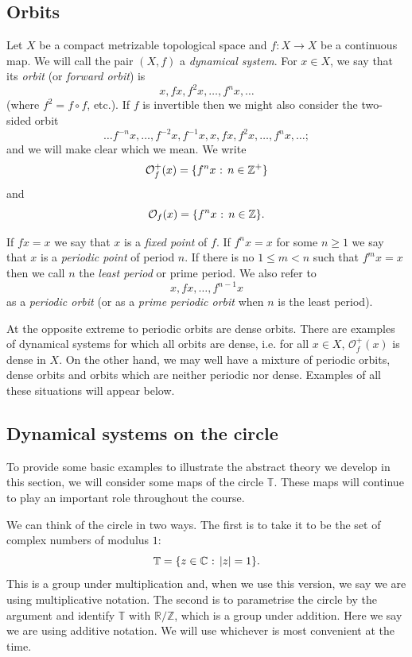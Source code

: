 \documentclass[12pt]{article}
\theoremstyle{definition}
\theoremstyle{remark}
\begin{document}
\subsection{Orbits}

Let $X$ be a compact metrizable topological space and $f: X \to X$ be a continuous map. 
We will call the pair $(X,f)$ a {\it dynamical system}.
For $x \in X$, we say that its {\it orbit} 
(or {\it forward orbit}) is
\[
x, fx, f^2x ,\ldots, f^nx ,\ldots
\]
(where $f^2 = f \circ f$, etc.).
If $f$ is invertible then we might also consider the two-sided orbit
\[
\ldots f^{-n}x ,\ldots ,f^{-2}x,f^{-1}x,x,fx,f^2x,\ldots,f^nx,\ldots;
\]
and we will make clear which we mean. We write
\[
\mathcal O_f^+(x) = \{f^n x \hbox{ : } n\in \mathbb Z^+\}
\]
and 
\[
\mathcal O_f(x) = \{f^n x \hbox{ : } n\in \mathbb Z\}.
\]

If $fx=x$ we say that $x$ is a {\it fixed point} of $f$. If $f^nx=x$ for some $n \ge 1$ we say that 
$x$ is a {\it periodic point} of period $n$. If there is no $1 \le m <n$ such that
$f^mx=x$ then we call $n$ the {\it least period} or prime period. We also refer to
\[
x,fx, \ldots, f^{n-1}x
\]
as a {\it periodic orbit} (or as a {\it prime periodic orbit} when $n$ is the least period).

At the opposite extreme to periodic orbits are dense orbits. There are examples of dynamical systems for which all orbits are dense, i.e. for all $x \in X$, $\mathcal O^+_f(x)$ is dense in $X$. On the other hand, we may well have a mixture of periodic orbits, dense orbits and orbits which are neither periodic nor dense.
Examples of all these situations will appear below.


\subsection{Dynamical systems on the circle}
To provide some basic examples to illustrate the abstract theory we develop in this section, we will consider some maps of the circle $\mathbb T$. These maps will continue to play an important role throughout the course.

We can think of the circle in two ways. The first is to take it to be the set of complex numbers of modulus 
$1$:
\[
\mathbb T = \{z \in \mathbb C \hbox{ : } |z|=1\}.
\]
This is a group under multiplication and, when we use this version, we say we are using 
multiplicative notation.
The second is to parametrise the circle by the argument and identify $\mathbb T$ with
$\mathbb R/\mathbb Z$, which is a group under addition. Here we say we are using additive notation.
We will use whichever is most convenient at the time.
\end{document}
